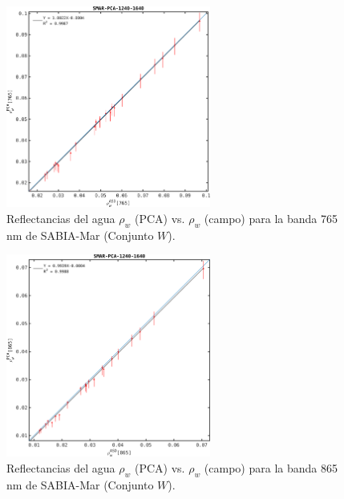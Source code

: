         \begin{figure}
        \centering
        \includegraphics[width=0.6\textwidth]{pca/figures/rhoW_Tc_SMAR_band_765_MC_1.png}
        \caption[Reflectancias del agua (PCA vs. campo) para la banda 765 nm de SABIA-Mar.]{Reflectancias del agua $\rho_{w}$ (PCA) vs. $\rho_{w}$ (campo) para la banda 765 nm de SABIA-Mar (Conjunto $W$).}
        \label{pca:rhoW_Tc_SMAR_band_765_MC_1}
        \end{figure}

        \begin{figure}
        \centering
        \includegraphics[width=0.6\textwidth]{pca/figures/rhoW_Tc_SMAR_band_865_MC_1.png}
        \caption[Reflectancias del agua (PCA vs. campo) para la banda 865 nm de SABIA-Mar.]{Reflectancias del agua $\rho_{w}$ (PCA) vs. $\rho_{w}$ (campo) para la banda 865 nm de SABIA-Mar (Conjunto $W$).}
        \label{pca:rhoW_Tc_SMAR_band_865_MC_1}
        \end{figure}

